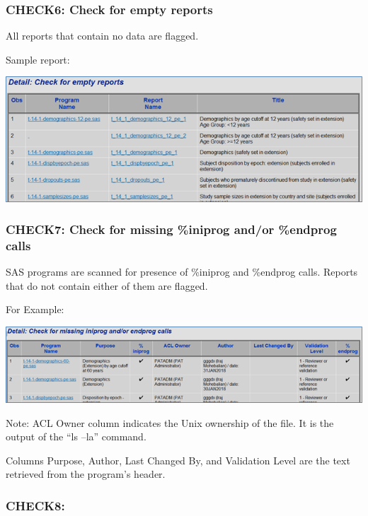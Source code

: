 \documentclass[
  letterpaper,
  DIV=11,
  numbers=noendperiod]{scrartcl}
\begin{document}
\hypertarget{check6-check-for-empty-reports}{%
\subsubsection{CHECK6: Check for empty
reports}\label{check6-check-for-empty-reports}}

All reports that contain no data are flagged.

Sample report:

\includegraphics{image/Picture7.png}

\hypertarget{check7-check-for-missing-iniprog-andor-endprog-calls}{%
\subsubsection{CHECK7: Check for missing \%iniprog and/or \%endprog
calls}\label{check7-check-for-missing-iniprog-andor-endprog-calls}}

SAS programs are scanned for presence of \%iniprog and \%endprog calls.
Reports that do not contain either of them are flagged.

For Example:

\includegraphics{image/Picture8.png}

Note: ACL Owner column indicates the Unix ownership of the file. It is
the output of the ``ls --la'' command.

Columns Purpose, Author, Last Changed By, and Validation Level are the
text retrieved from the program's header.~~

\hypertarget{check8}{%
\subsubsection{CHECK8:}\label{check8}}
\end{document}
